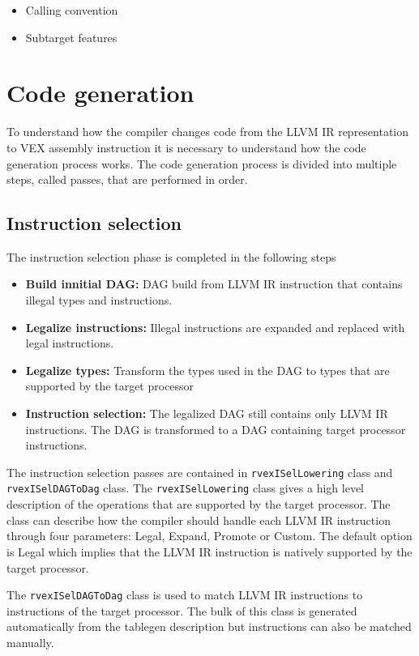 \begin{itemize}
	\item Calling convention
	\item Subtarget features
\end{itemize}

\section{Code generation}
To understand how the compiler changes code from the LLVM IR representation to VEX assembly instruction it is necessary to understand how the code generation process works. The code generation process is divided into multiple steps, called passes, that are performed in order. 

\subsection{Instruction selection}
The instruction selection phase is completed in the following steps
\begin{itemize}
  \item \textbf{Build innitial DAG:} DAG build from LLVM IR instruction that contains illegal types and instructions.
  \item \textbf{Legalize instructions:} Illegal instructions are expanded and replaced with legal instructions.
  \item \textbf{Legalize types:} Transform the types used in the DAG to types that are supported by the target processor 
  \item \textbf{Instruction selection:} The legalized DAG still contains only LLVM IR instructions. The DAG is transformed to a DAG containing target processor instructions.
\end{itemize}

The instruction selection passes are contained in \texttt{rvexISelLowering} class and \texttt{rvexISelDAGToDag} class. The \texttt{rvexISelLowering} class gives a high level description of the operations that are supported by the target processor. The class can describe how the compiler should handle each LLVM IR instruction through four parameters: Legal, Expand, Promote or Custom. The default option is Legal which implies that the LLVM IR instruction is natively supported by the target processor.

The \texttt{rvexISelDAGToDag} class is used to match LLVM IR instructions to instructions of the target processor. The bulk of this class is generated automatically from the tablegen description but instructions can also be matched manually.

